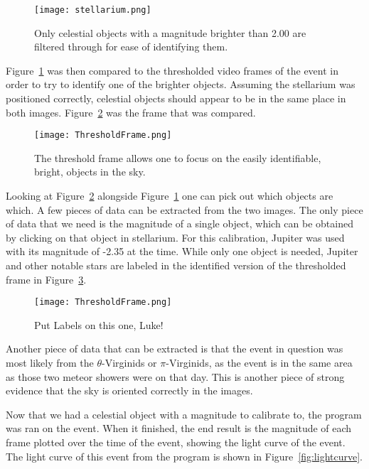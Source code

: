 \begin{figure}[ht!]
	\centering
	\texttt{[image: stellarium.png]}
	\caption{Only celestial objects with a magnitude brighter than 2.00 are filtered through for ease of identifying them.}
	\label{fig:stellarium}
\end{figure}

Figure~\ref{fig:stellarium} was then compared to the thresholded video frames of the event in order to try to identify one of the brighter objects. Assuming the stellarium was positioned correctly, celestial objects should appear to be in the same place in both images. Figure~\ref{fig:ThresholdFrame} was the frame that was compared. 

\begin{figure}[ht!]
	\centering
	\texttt{[image: ThresholdFrame.png]}
	\caption{The threshold frame allows one to focus on the easily identifiable, bright, objects in the sky.}
	\label{fig:ThresholdFrame}
\end{figure}

Looking at Figure~\ref{fig:ThresholdFrame} alongside Figure~\ref{fig:stellarium} one can pick out which objects are which. A few pieces of data can be extracted from the two images. The only piece of data that we need is the magnitude of a single object, which can be obtained by clicking on that object in stellarium. For this calibration, Jupiter was used with its magnitude of -2.35 at the time. While only one object is needed, Jupiter and other notable stars are labeled in the identified version of the thresholded frame in Figure~\ref{fig:FrameLabel}.

\begin{figure}[ht!]
	\centering
	\texttt{[image: ThresholdFrame.png]}
	\caption{Put Labels on this one, Luke!}
	\label{fig:FrameLabel}
\end{figure}

Another piece of data that can be extracted is that the event in question was most likely from the $\theta$-Virginids or $\pi$-Virginids, as the event is in the same area as those two meteor showers were on that day. This is another piece of strong evidence that the sky is oriented correctly in the images.

Now that we had a celestial object with a magnitude to calibrate to, the program was ran on the event. When it finished, the end result is the magnitude of each frame plotted over the time of the event, showing the light curve of the event. The light curve of this event from the program is shown in Figure~\ref{fig:lightcurve}. 

